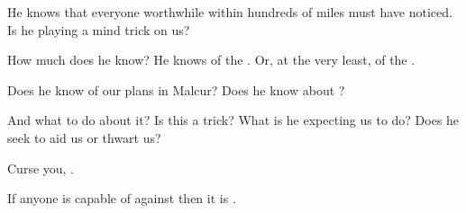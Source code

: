 \begin{garbage}
{  He knows that everyone worthwhile within hundreds of miles must have noticed. 
  Is he playing a mind trick on us? 
  
  How much does he know? 
  He knows of the \ghobaleth. 
  Or, at the very least, of the \ghobal. 
  
  Does he know of our plans in Malcur? 
  Does he know about \Nithdornazsh? 
  
  And what to do about it? 
  Is this a trick? 
  What is he expecting us to do? 
  Does he seek to aid us or thwart us? 
  
  Curse you, \Ishnaruchaefir. 
  
  
  If anyone is capable of  against \Ishnaruchaefir\prikker then it is \Secherdamon.
}
 
\end{garbage}